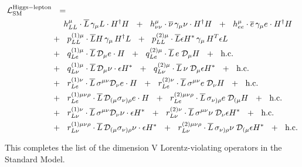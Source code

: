 \documentclass[12pt,preprintnumbers,nofootinbib]{revtex4}
\newcommand{\ov}{\overline}
\newcommand{\md}{\mathcal{D}}
\begin{document}
\begin{align}
\notag
	\mathcal{L}_{\rm SM}^{\rm Higgs-lepton} & ~~=~~
	\\
\notag
	&
	\phantom{+~~}
	h_{LL}^\mu \cdot
	\ov{L}\, \gamma_\mu L \cdot H^\dag H ~~+~~
	h_{\nu\nu}^\mu \cdot
	\ov{\nu}\, \gamma_\mu \nu \cdot H^\dag H ~~+~~
	h_{ee}^\mu \cdot
	\ov{e}\, \gamma_\mu e \cdot H^\dag H 
	\\
\notag
	&
	+~~
	p^{(1)\mu}_{LL} \cdot
	\ov{L}H \, \gamma_\mu\, H^\dag L ~~+~~
	p^{(2)\mu}_{LL} \cdot
	\ov{L}\epsilon H^* \, \gamma_\mu \, H^T \epsilon L 
	\\
\notag
	&
	+~~
	q^{(1)\mu}_{Le} \cdot
	\ov{L}\, \md_\mu e\cdot H ~~+~~
	q^{(2)\mu}_{Le} \cdot
	\ov{L}\, e \; \md_\mu H ~~+~~
	\text{h.c.}
	\\
\notag
	&
	+~~
	q^{(1)\mu}_{L\nu} \cdot
	\ov{L}\, \md_\mu \nu \cdot \epsilon H^* ~~+~~
	q^{(2)\mu}_{L\nu} \cdot
	\ov{L}\, \nu \; \md_\mu \epsilon H^* ~~+~~
	\text{h.c.}
	\\
\notag
	&
	+~~
	r^{(1)\nu}_{Le} \cdot
	\ov{L}\, \sigma^{\mu\nu} \md_\nu e \cdot H ~~+~~
	r^{(2)\nu}_{Le} \cdot
	\ov{L}\, \sigma^{\mu\nu} e\; \md_\nu H ~~+~~
	\text{h.c.}
	\\
\notag
	&
	+~~
	r^{(1)\mu\nu\rho}_{Le} \cdot
	\ov{L}\, \md_{(\mu} \sigma_{\nu)\rho} e \cdot H ~~+~~
	r^{(2)\mu\nu\rho}_{Le} \cdot
	\ov{L}\, \sigma_{\nu)\rho} e \; \md_{(\mu} H ~~+~~
	\text{h.c.}
	\\
\notag
	&
	+~~
	r^{(1)\nu}_{L\nu} \cdot
	\ov{L}\, \sigma^{\mu\nu} \md_\nu \nu \cdot \epsilon H^* ~~+~~
	r^{(2)\nu}_{L\nu} \cdot
	\ov{L}\, \sigma^{\mu\nu} \nu\; \md_\nu \epsilon H^* ~~+~~
	\text{h.c.}
	\\
\notag
	&
	+~~
	r^{(1)\mu\nu\rho}_{L\nu} \cdot
	\ov{L}\, \md_{(\mu} \sigma_{\nu)\rho} \nu \cdot \epsilon H^* ~~+~~
	r^{(2)\mu\nu\rho}_{L\nu} \cdot
	\ov{L}\, \sigma_{\nu)\rho} \nu \; \md_{(\mu} \epsilon H^* ~~+~~
	\text{h.c.}
\end{align}

	This completes the list of the dimension V Lorentz-violating
	operators in the Standard Model.
\end{document}
